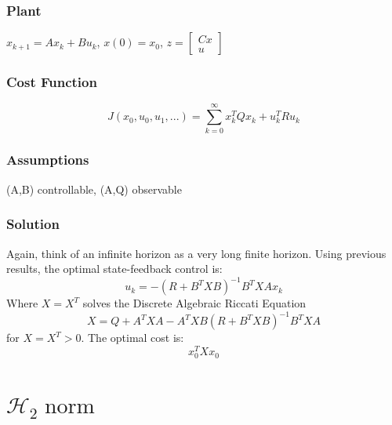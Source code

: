 \documentclass{article}
\begin{document}
\subsubsection*{Plant}
$x_{k+1} = Ax_k + Bu_k$, $x(0) = x_0$, $z = \begin{bmatrix}
    Cx \\ u
\end{bmatrix}$ 
\subsubsection*{Cost Function}
\[
J(x_0,u_0,u_1,...) = \sum_{k=0}^{\infty} x_k^T Q x_k + u_k^T R u_k
\]
\subsubsection*{Assumptions}
(A,B) controllable, (A,Q) observable
\subsubsection*{Solution}
Again, think of an infinite horizon as a very long finite horizon. Using previous results, the optimal state-feedback control is:
\[
u_k = -(R + B^T X B)^{-1} B^T XAx_k
\]
Where $X = X^T$ solves the Discrete Algebraic Riccati Equation
\begin{equation}\label{dare}
X = Q + A^TXA - A^TXB(R+B^TXB)^{-1}B^TXA
\end{equation}
for $X = X^T > 0$. The optimal cost is: 
\[
x_0^T X x_0
\]
\section{ \texorpdfstring{$\mathcal{H}_2 \; \text{norm}$}. }
\end{document}
